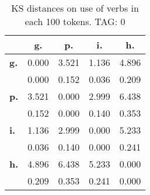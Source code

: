 \begin{table}[h!]
\begin{center}
\begin{tabular}{| l || c | c | c | c |}\hline
 & {\bf g.} & {\bf p.} & {\bf i.} & {\bf h.} \\\hline\hline
{\bf g.} & 0.000 & 3.521 & 1.136 & 4.896 \\
{\bf } & 0.000 & 0.152 & 0.036 & 0.209 \\\hline
{\bf p.} & 3.521 & 0.000 & 2.999 & 6.438 \\
{\bf } & 0.152 & 0.000 & 0.140 & 0.353 \\\hline
{\bf i.} & 1.136 & 2.999 & 0.000 & 5.233 \\
{\bf } & 0.036 & 0.140 & 0.000 & 0.241 \\\hline
{\bf h.} & 4.896 & 6.438 & 5.233 & 0.000 \\
{\bf } & 0.209 & 0.353 & 0.241 & 0.000 \\\hline
\end{tabular}
\caption{KS distances on use of verbs in each 100 tokens. TAG: 0}
\end{center}
\end{table}